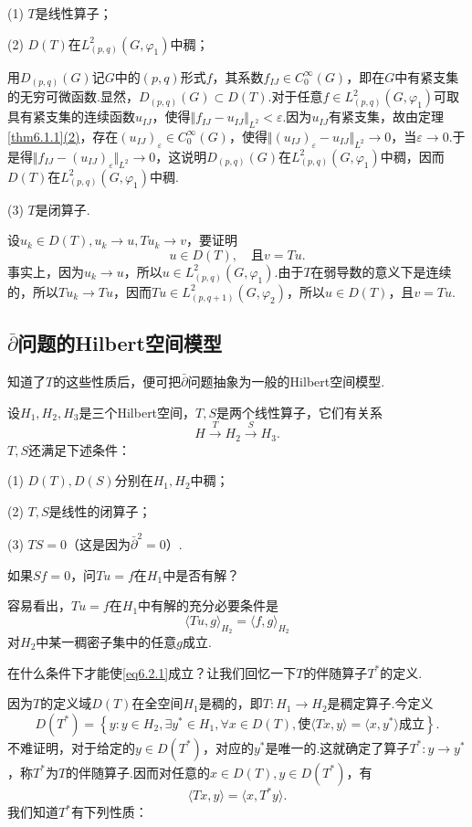 (1)
$T$是线性算子；

(2)
$D(T)$在$L_{(p,q)}^2(G,\varphi_1)$中稠；

用$D_{(p,q)}(G)$记$G$中的$(p,q)$形式$f$，其系数$f_{IJ}\in C_0^\infty(G)$，即在$G$中有紧支集的无穷可微函数.显然，$D_{(p,q)}(G)\subset D(T)$.对于任意$f\in L_{(p,q)}^2(G,\varphi_1)$可取具有紧支集的连续函数$u_{IJ}$，使得$\Vert f_{IJ}-u_{IJ}\Vert_{L^2}<\varepsilon$.因为$u_{IJ}$有紧支集，故由定理\ref{thm6.1.1}\hyperlink{6.1.1}{(2)}，存在$(u_{IJ})_\varepsilon\in C_0^\infty(G)$，使得$\Vert (u_{IJ})_\varepsilon-u_{IJ}\Vert_{L^2}\to0$，当$\varepsilon\to0$.于是得$\Vert f_{IJ}-(u_{IJ})_\varepsilon\Vert_{L^2}\to0$，这说明$D_{(p,q)}(G)$在$L_{(p,q)}^2(G,\varphi_1)$中稠，因而$D(T)$在$L_{(p,q)}^2(G,\varphi_1)$中稠.

(3)
$T$是闭算子.

设$u_k\in D(T),u_k\to u,Tu_k\to v$，要证明
\[u\in D(T),\quad\text{且$v=Tu$}.\]
事实上，因为$u_k\to u$，所以$u\in L_{(p,q)}^2(G,\varphi_1)$.由于$T$在弱导数的意义下是连续的，所以$Tu_k\to Tu$，因而$Tu\in L_{(p,q+1)}^2(G,\varphi_2)$，所以$u\in D(T)$，且$v=Tu$.
\subsection{$\bar{\partial}$问题的Hilbert空间模型}
知道了$T$的这些性质后，便可把$\bar{\partial}$问题抽象为一般的Hilbert空间模型.

设$H_1,H_2,H_3$是三个Hilbert空间，$T,S$是两个线性算子，它们有关系
\[H\overset{T}{\longrightarrow}H_2\overset{S}{\longrightarrow}H_3.\]
$T,S$还满足下述条件：

(1)
$D(T),D(S)$分别在$H_1,H_2$中稠；

(2)
$T,S$是线性的闭算子；

(3)
$TS=0$（这是因为$\bar{\partial}^2=0$）.

如果$Sf=0$，问$Tu=f$在$H_1$中是否有解？

容易看出，$Tu=f$在$H_1$中有解的充分必要条件是
\begin{equation}\label{eq6.2.1}
	\langle Tu,g\rangle_{H_2}=\langle f,g\rangle_{H_2}
\end{equation}
对$H_2$中某一稠密子集中的任意$g$成立.

在什么条件下才能使\eqref{eq6.2.1}成立？让我们回忆一下$T$的伴随算子$T^\ast$的定义.

因为$T$的定义域$D(T)$在全空间$H_1$是稠的，即$T\colon H_1\to H_2$是稠定算子.今定义
\[D(T^\ast)=\left\{y\colon y\in H_2,\exists y^\ast \in H_1,\forall x\in D(T),\text{使$\langle Tx,y\rangle=\langle x,y^\ast\rangle$成立}\right\}.\]
不难证明，对于给定的$y\in D(T^\ast)$，对应的$y^\ast$是唯一的.这就确定了算子$T^\ast\colon y\to y^\ast$，称$T^\ast$为$T$的伴随算子.因而对任意的$x\in D(T),y\in D(T^\ast)$，有
\[\langle Tx,y\rangle=\langle x,T^\ast y\rangle.\]
我们知道$T^\ast$有下列性质：

